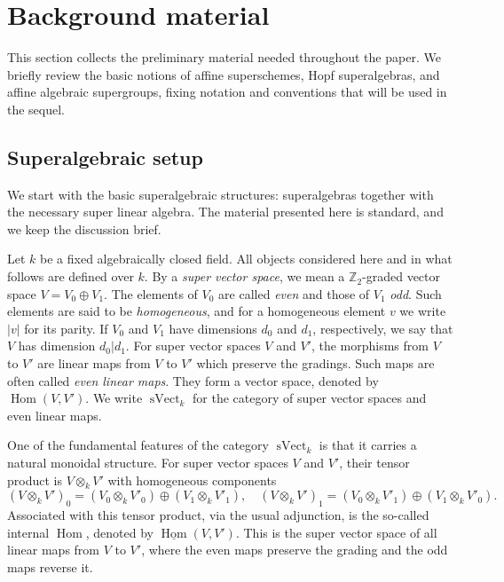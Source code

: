 \documentclass[11pt,a4paper,reqno,noamsfonts]{amsart}
\numberwithin{equation}{section}
\theoremstyle{definition}
\theoremstyle{remark}
\DeclareMathOperator{\Hom}{Hom}
\DeclareMathOperator{\sVect}{sVect}
\begin{document}

\section{Background material}\label{sec:2}
This section collects the preliminary material needed throughout the paper. We briefly review the basic notions of affine superschemes, Hopf superalgebras, and affine algebraic supergroups, fixing notation and conventions that will be used in the sequel.

%
\subsection{Superalgebraic setup}
We start with the basic superalgebraic structures: superalgebras together with the necessary super linear algebra. The material presented here is standard, and we keep the discussion brief. 

Let $k$ be a fixed algebraically closed field. All objects considered here and in what follows are defined over $k$. By a \emph{super vector space}, we mean a $\mathbb{Z}_2$-graded vector space $V = V_0 \oplus V_1$. The elements of $V_0$ are called \emph{even} and those of $V_1$ \emph{odd}. Such elements are said to be \emph{homogeneous}, and for a homogeneous element $v$ we write $\lvert v \rvert$ for its parity. If $V_0$ and $V_1$ have dimensions $d_0$ and $d_1$, respectively, we say that $V$ has dimension $d_0 \vert d_1$. For super vector spaces $V$ and $V'$, the morphisms from $V$ to $V'$ are linear maps from $V$ to $V'$ which preserve the gradings. Such maps are often called \emph{even linear maps}. They form a vector space, denoted by $\Hom(V,V')$. We write $\sVect_k$  for the category of super vector spaces and even linear maps.

One of the fundamental features of the category $\sVect_k$ is that it carries a natural monoidal structure. For super vector spaces $V$ and $V'$, their tensor product is $V \otimes_k V'$ with homogeneous components
\begin{equation}
(V \otimes_k V')_0 = (V_0 \otimes_k V'_0) \oplus (V_1 \otimes_k V'_1), \quad (V \otimes_k V')_1 = (V_0 \otimes_k V'_1) \oplus (V_1 \otimes_k V'_0).
\end{equation}
Associated with this tensor product, via the usual adjunction, is the so-called internal $\Hom$, denoted by $\underline{\Hom}(V,V')$. This is the super vector space of all linear maps from $V$ to $V'$, where the even maps preserve the grading and the odd maps reverse it.
\end{document}
